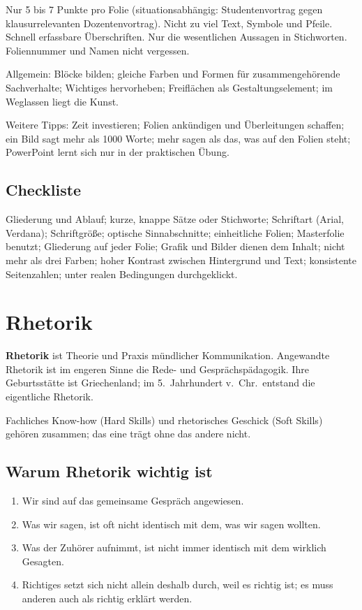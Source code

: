 \documentclass[12pt, a4paper]{article}
\begin{document}
Nur 5 bis 7 Punkte pro Folie (situationsabhängig: Studentenvortrag gegen
klausurrelevanten Dozentenvortrag). Nicht zu viel Text, Symbole und Pfeile.
Schnell erfassbare Überschriften. Nur die wesentlichen Aussagen in
Stichworten. Foliennummer und Namen nicht vergessen.

Allgemein: Blöcke bilden; gleiche Farben und Formen für zusammengehörende
Sachverhalte; Wichtiges hervorheben; Freiflächen als Gestaltungselement;
\glqq im Weglassen liegt die Kunst\grqq{}.

Weitere Tipps: Zeit investieren; Folien ankündigen und Überleitungen
schaffen; ein Bild sagt mehr als 1000 Worte; mehr sagen als das, was auf den
Folien steht; PowerPoint lernt sich nur in der praktischen Übung.

\subsection{Checkliste}

Gliederung und Ablauf; kurze, knappe Sätze oder Stichworte; Schriftart (Arial,
Verdana); Schriftgröße; optische Sinnabschnitte; einheitliche Folien;
Masterfolie benutzt; Gliederung auf jeder Folie; Grafik und Bilder dienen dem
Inhalt; nicht mehr als drei Farben; hoher Kontrast zwischen Hintergrund und
Text; konsistente Seitenzahlen; unter realen Bedingungen durchgeklickt.

\section{Rhetorik}

\begin{definitionbox}
\textbf{Rhetorik} ist Theorie und Praxis mündlicher Kommunikation. Angewandte
Rhetorik ist im engeren Sinne die Rede- und Gesprächspädagogik. Ihre
Geburtsstätte ist Griechenland; im 5.\ Jahrhundert v.\ Chr.\ entstand die
eigentliche Rhetorik.
\end{definitionbox}

Fachliches Know-how (Hard Skills) und rhetorisches Geschick (Soft Skills)
gehören zusammen; das eine trägt ohne das andere nicht.

\subsection{Warum Rhetorik wichtig ist}

\begin{enumerate}
  \item Wir sind auf das gemeinsame Gespräch angewiesen.
  \item Was wir sagen, ist oft nicht identisch mit dem, was wir sagen
        wollten.
  \item Was der Zuhörer aufnimmt, ist nicht immer identisch mit dem wirklich
        Gesagten.
  \item Richtiges setzt sich nicht allein deshalb durch, weil es richtig ist;
        es muss anderen auch als richtig erklärt werden.
\end{enumerate}
\end{document}

